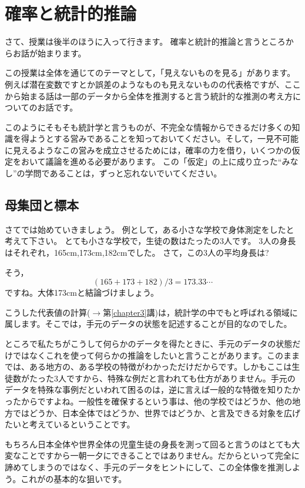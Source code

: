 \documentclass{ltjsbook}
\begin{document}
\chapter{確率と統計的推論}
\label{chapter16}
さて、授業は後半のほうに入って行きます。
確率と統計的推論と言うところからお話が始まります。

この授業は全体を通じてのテーマとして，「見えないものを見る」があります。
例えば潜在変数ですとか誤差のようなものも見えないものの代表格ですが、ここから始まる話は一部のデータから全体を推測すると言う統計的な推測の考え方についてのお話です。

このようにそもそも統計学と言うものが、不完全な情報からできるだけ多くの知識を得ようとする営みであることを知っておいてください。そして，一見不可能に見えるようなこの営みを成立させるためには，確率の力を借り，いくつかの仮定をおいて議論を進める必要があります。
この「仮定」の上に成り立った``みなし''の学問であることは，ずっと忘れないでいてください。

\section{母集団と標本}
さてでは始めていきましょう。
例として，ある小さな学校で身体測定をしたと考えて下さい。
とても小さな学校で，生徒の数はたったの3人です。
3人の身長はそれぞれ，165cm,173cm,182cmでした。
さて，この3人の平均身長は?

そう，
$$ (165+173+182)/3=173.33\cdots$$
ですね。大体173cmと結論づけましょう。

こうした代表値の計算($\to$第\ref{chapter3}講)は，統計学の中でもと呼ばれる領域に属します。そこでは，手元のデータの状態を記述することが目的なのでした。

ところで私たちがこうして何らかのデータを得たときに、手元のデータの状態だけではなくこれを使って何らかの推論をしたいと言うことがあります。このままでは、ある地方の、ある学校の特徴がわかっただけだからです。しかもここは生徒数がたった3人ですから、特殊な例だと言われても仕方がありません。手元のデータを特殊な事例だといわれて困るのは，逆に言えば一般的な特徴を知りたかったからですよね。一般性を確保するという事は、他の学校ではどうか、他の地方ではどうか、日本全体ではどうか、世界ではどうか、と言及できる対象を広げたいと考えているということです。

もちろん日本全体や世界全体の児童生徒の身長を測って回ると言うのはとても大変なことですから一朝一夕にできることではありません。だからといって完全に諦めてしまうのではなく、手元のデータをヒントにして、この全体像を推測しよう。これがの基本的な狙いです。
\end{document}
